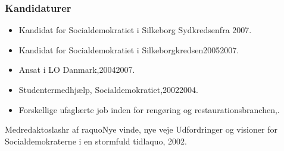 \documentclass[11pt, a4paper]{awesome-cv}
\begin{document}
\begin{cvletter}
\subsubsection*{Kandidaturer}
\begin{itemize}
\item Kandidat for Socialdemokratiet i Silkeborg Sydkredsenfra 2007.
\item Kandidat for Socialdemokratiet i Silkeborgkredsen20052007.
\end{itemize}
\begin{itemize}
\item Ansat i LO Danmark,20042007.
\item Studentermedhjælp, Socialdemokratiet,20022004.
\item Forskellige ufaglærte job inden for rengøring og restaurationsbranchen,.
\end{itemize}
Medredaktoslashr af raquoNye vinde, nye veje  Udfordringer og visioner for Socialdemokraterne i en stormfuld tidlaquo, 2002.

\end{cvletter}
\end{document}
